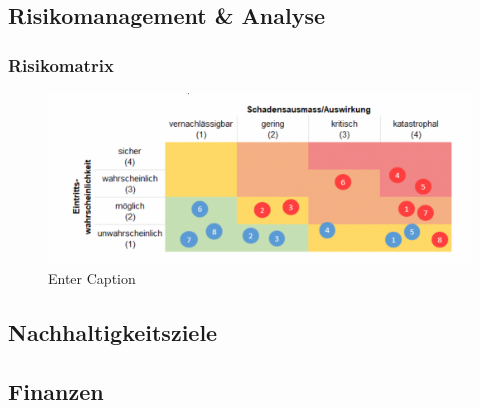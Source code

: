 \documentclass{article}
\begin{document}
\subsection{Risikomanagement \& Analyse}

\subsubsection{Risikomatrix}
\begin{figure}[H]
    \centering
    \includegraphics[width=0.8\linewidth]{Images/Risikomatrix.png}
    \caption{Enter Caption}
    \label{fig:enter-label}
\end{figure}

\subsection{Nachhaltigkeitsziele}
\subsection{Finanzen}

\newpage
\listoffigures %
\listoftables %




\end{document}
